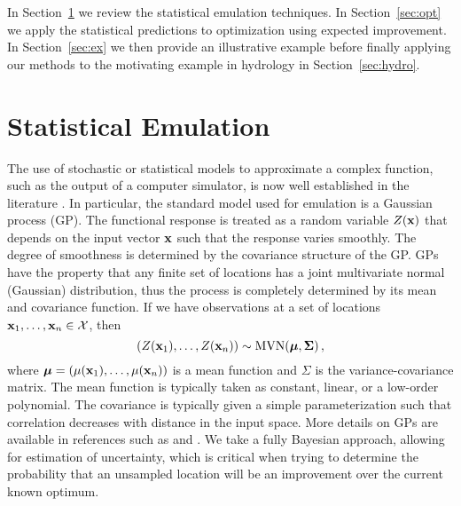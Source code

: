 \documentclass[12pt]{article}
\begin{document}
In Section~\ref{sec:models} we review the statistical emulation
techniques.  In Section~\ref{sec:opt} we apply the statistical
predictions to optimization using expected improvement.  In
Section~\ref{sec:ex} we then
provide an illustrative example before finally applying our methods to
the motivating example in hydrology in Section~\ref{sec:hydro}.


\section{Statistical Emulation} \label{sec:models}

The use of stochastic or statistical models to approximate a complex
function, such as the output of a computer simulator, is now well
established in the literature
\cite{sack:welc:mitc:wynn:1989,kennedy:ohagan:2000,sant:will:notz:2003,fang:li:sudj:2006}.
In particular, the standard model used for emulation is a Gaussian
process (GP).  The functional response is treated as a random variable
$Z({\bf x})$ that depends on the input vector ${\bf x}$ such that the
response varies smoothly.  The degree of smoothness is determined by
the covariance structure of the GP. GPs have the property that any
finite set of locations has a joint multivariate normal (Gaussian)
distribution, thus the process is completely determined by its mean
and covariance function. If we have observations at a set of locations
${\bf x}_1, \ldots, {\bf x}_n \in \mathcal{X}$, then
\begin{equation}
\left(Z({\bf x}_1), \ldots, Z({\bf x}_n)\right) \sim \mathrm{MVN}\!\left(
  \mbox{\boldmath{$\mu$}}, \mbox{\boldmath{$\Sigma$}} \right) ,
\end{equation}
where $\mbox{\boldmath{$\mu$}} = \left(\mu({\bf x}_1), \ldots,
  \mu({\bf x}_n)\right)$ is a mean function and {\boldmath $\Sigma$}
is the variance-covariance matrix.  The mean function is typically
taken as constant, linear, or a low-order polynomial.  The covariance
is typically given a simple parameterization such that correlation
decreases with distance in the input space.  More details on GPs are
available in references such as \cite{cres:1993} and
\cite{stei:1999}.  We take a fully Bayesian approach, allowing for
estimation of uncertainty, which is critical when trying to determine
the probability that an unsampled location will be an improvement over
the current known optimum.
\end{document}
